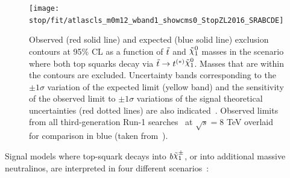 			\begin{figure}[htpb]
			  \begin{center} \texttt{[image: stop/fit/atlascls\_m0m12\_wband1\_showcms0\_StopZL2016\_SRABCDE]}
			    \caption{Observed (red solid line) and expected (blue solid line)
			      exclusion contours at 95\% CL as a function of $\tilde{t}$ and
			      $\ninoone$ masses in the scenario where both top squarks decay
			      via $\stop\to t^{(*)} \ninoone$. Masses that are within the contours are excluded. Uncertainty bands corresponding to the $\pm 1
			      \sigma$ variation of the expected limit (yellow band) and the
			      sensitivity of the observed limit to $\pm 1\sigma$ variations of
			      the signal theoretical uncertainties (red dotted lines) are also
			      indicated~\cite{stop0L}. Observed limits from all third-generation Run-1 searches~\cite{Atlas8TeVSummary} at $\sqrt{s}=8$ TeV overlaid for comparison in blue (taken from~\cite{stop0L}).}
			    \label{fig:SRABC_exclusion}
			  \end{center}
			\end{figure}

			Signal models where top-squark decays into $b \chinoonepm$, or into additional massive neutralinos, are interpreted in four different scenarios~\cite{stop0L}:

